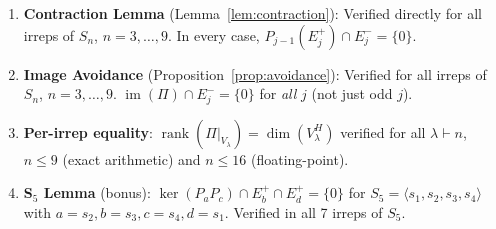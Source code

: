 \documentclass[11pt]{article}
\theoremstyle{definition}
\theoremstyle{remark}
\newcommand{\rank}{\operatorname{rank}}
\newcommand{\im}{\operatorname{im}}
\begin{document}
\begin{enumerate}
\item \textbf{Contraction Lemma} (Lemma~\ref{lem:contraction}):
Verified directly for all irreps of $S_n$, $n = 3, \ldots, 9$.
In every case, $P_{j-1}(E_j^+) \cap E_j^- = \{0\}$.

\item \textbf{Image Avoidance} (Proposition~\ref{prop:avoidance}):
Verified for all irreps of $S_n$, $n = 3, \ldots, 9$.
$\im(\Pi) \cap E_j^- = \{0\}$ for \emph{all} $j$ (not just odd $j$).

\item \textbf{Per-irrep equality}: $\rank(\Pi|_{V_\lambda}) = \dim(V_\lambda^H)$
verified for all $\lambda \vdash n$, $n \leq 9$ (exact arithmetic) and
$n \leq 16$ (floating-point).

\item \textbf{S$_5$ Lemma} (bonus): $\ker(P_a P_c) \cap E_b^+ \cap E_d^+ = \{0\}$
for $S_5 = \langle s_1, s_2, s_3, s_4 \rangle$ with $a = s_2, b = s_3,
c = s_4, d = s_1$. Verified in all 7 irreps of $S_5$.
\end{enumerate}
\end{document}

